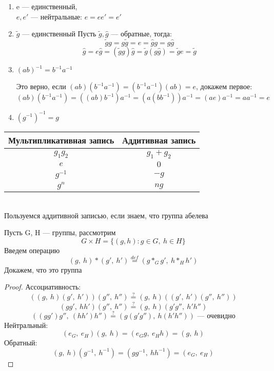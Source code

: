 \documentclass[main]{subfiles}
\begin{document}
    \begin{theorem}
        \begin{enumerate}
            \item e --- единственный, \\
                $e,e'$ --- нейтральные: $e=e e'=e'$
            \item $\widetilde{g}$ --- единственный
                Пусть $\widetilde{g},\hat{g}$ --- обратные, тогда:
                \[\widetilde{g}g = g\widetilde{g} = e = \hat{g}g = g\hat{g}\]
                \[\hat{g}=e \hat{g}=(\widetilde{g}g)\hat{g}=\widetilde{g}(g\hat{g})=\widetilde{g}e=\widetilde{g}\]
                \item $(a b)^{-1}=b^{-1}a^{-1}$

                Это верно, если $(ab)(b^{-1}a^{-1})=(b^{-1}a^{-1})(ab)=e$, докажем первое:
                \[(ab)(b^{-1}a^{-1})=((ab)b^{-1})a^{-1}=(a(bb^{-1}))a^{-1}=(ae)a^{-1}=a a^{-1}=e\]
            \item $(g^{-1})^{-1}=g$
        \end{enumerate}
    \end{theorem}

    \begin{tabular} {c|c}
    	Мультипликативная запись & Аддитивная запись\\ \hline
    	$g_1 g_2$ & $g_1 + g_2$\\
    	$e$ & $0$\\
    	$g^{-1}$ & $-g$\\
        $g^n$ & $ng$
    \end{tabular}\\
    Пользуемся аддитивной записью, если знаем, что группа абелева

    \begin{definition}
		Пусть G, H --- группы, рассмотрим
		\[G \times H = \{(g,h): g\in G,\ h\in H\}\]
		Введем операцию
		\[(g,\ h)*(g',\ h')\overset{def}{=}(g*_G g',\ h*_H h')\]
		Докажем, что это группа
	\end{definition}

	\begin{proof}
		Ассоциативность:
        \[((g,\ h)(g',\ h'))(g'',\ h'') \overset{?}{=} (g,\ h)((g',\ h')(g'',\ h''))\]
		\[(gg',\ hh')(g'',\ h'') \overset{?}{=} (g,\ h)(g' g'',\ h' h'')\]
        \[((gg')g'',\ (hh')h'') \overset{?}{=} (g(g'g''),\ h(h'h'')) \text{ --- очевидно}\]
		Нейтральный:
		\[(e_G,\ e_H)(g,\ h) = (e_G g,\ e_H h) = (g,\ h)\]
		Обратный:
		\[(g,\ h)(g^{-1},\ h^{-1}) = (g g^{-1},\ h h^{-1}) = (e_G,\ e_H)\]
	\end{proof}
\end{document}
